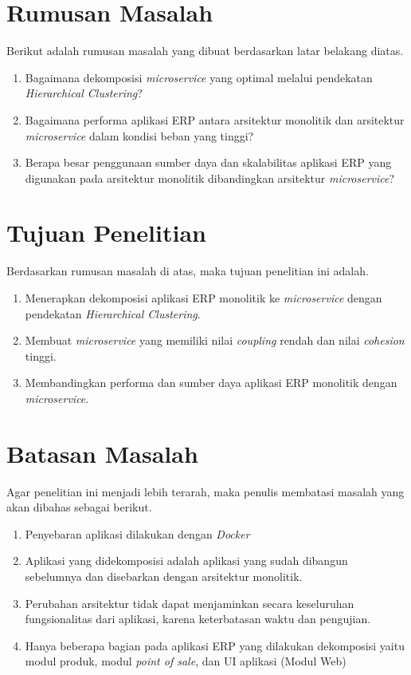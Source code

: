 \hfill \break

\section{Rumusan Masalah}
Berikut adalah rumusan masalah yang dibuat berdasarkan latar belakang diatas.
\begin{enumerate}[nolistsep,leftmargin=0.5cm]
  \item Bagaimana dekomposisi \textit{microservice} yang optimal melalui pendekatan \textit{Hierarchical Clustering}?
  \item Bagaimana performa aplikasi ERP antara arsitektur monolitik dan arsitektur \textit{microservice} dalam kondisi beban yang tinggi?
  \item Berapa besar penggunaan sumber daya dan skalabilitas aplikasi ERP yang digunakan pada arsitektur monolitik dibandingkan arsitektur \textit{microservice}?\\
\end{enumerate}

\section{Tujuan Penelitian}
Berdasarkan rumusan masalah di atas, maka tujuan penelitian ini adalah.
\begin{enumerate}[nolistsep,leftmargin=0.5cm]
  \item Menerapkan dekomposisi aplikasi ERP monolitik ke \textit{microservice} dengan pendekatan \textit{Hierarchical Clustering}.
  \item Membuat \textit{microservice} yang memiliki nilai \textit{coupling} rendah dan nilai \textit{cohesion} tinggi.
  \item Membandingkan performa dan sumber daya aplikasi ERP monolitik dengan \textit{microservice}. \\
\end{enumerate}

\section{Batasan Masalah}
Agar penelitian ini menjadi lebih terarah, maka penulis membatasi masalah yang akan dibahas sebagai berikut.
\begin{enumerate}[nolistsep,leftmargin=0.5cm]
  \item Penyebaran aplikasi dilakukan dengan \textit{Docker}
  \item Aplikasi yang didekomposisi adalah aplikasi yang sudah dibangun sebelumnya dan disebarkan dengan arsitektur monolitik.
  \item Perubahan arsitektur tidak dapat menjaminkan secara keseluruhan fungsionalitas dari aplikasi, karena keterbatasan waktu dan pengujian.
  \item Hanya beberapa bagian pada aplikasi ERP yang dilakukan dekomposisi yaitu modul produk, modul \textit{point of sale}, dan UI aplikasi (Modul Web) \\
\end{enumerate}

